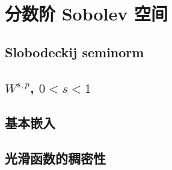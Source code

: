 \section{分数阶 Sobolev 空间}
\label{b1:sec:2302}


\subsection{Slobodeckij seminorm}
\label{b1:subsec:230201}

\subsection{\texorpdfstring{\(W^{s,p}\)}{Ws,p}, \texorpdfstring{\(0<s<1\)}{0<s<1}}
\label{b1:subsec:230202}

\subsection{基本嵌入}
\label{b1:subsec:230203}

\subsection{光滑函数的稠密性}
\label{b1:subsec:230204}


